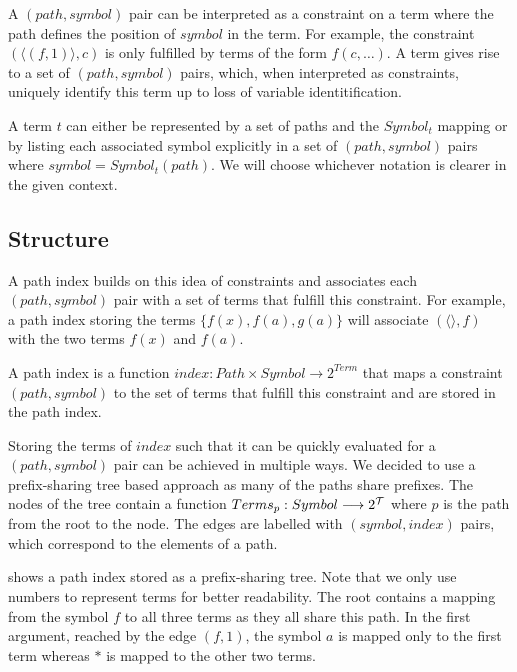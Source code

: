 A $(path, symbol)$ pair can be interpreted as a constraint on a term where the path defines the position of $symbol$ in the term. For example, the constraint $(\langle (f,1) \rangle, c)$ is only fulfilled by terms of the form $f(c,\dots)$. A term gives rise to a set of $(path, symbol)$ pairs, which, when interpreted as constraints, uniquely identify this term up to loss of variable identitification.

A term $t$ can either be represented by a set of paths and the $Symbol_{t}$ mapping or by listing each associated symbol explicitly in a set of $(path, symbol)$ pairs where $symbol = Symbol_{t}(path)$. We will choose whichever notation is clearer in the given context.

\subsection{Structure}
A path index builds on this idea of constraints and associates each $(path, symbol)$ pair with a set of terms that fulfill this constraint. For example, a path index storing the terms $\{f(x), f(a), g(a)\}$ will associate $(\langle \rangle, f)$ with the two terms $f(x)$ and $f(a)$.

\begin{defn}
  A path index is a function $index: Path \times Symbol \longrightarrow 2^{Term}$ that maps a constraint $(path,symbol)$ to the set of terms that fulfill this constraint and are stored in the path index.
\end{defn}

Storing the terms of $index$ such that it can be quickly evaluated for a $(path, symbol)$ pair can be achieved in multiple ways. We decided to use a prefix-sharing tree based approach as many of the paths share prefixes. The nodes of the tree contain a function $Terms_{p}: Symbol  \longrightarrow 2^{\mathcal{T}}$ where $p$ is the path from the root to the node. The edges are labelled with $(symbol, index)$ pairs, which correspond to the elements of a path.

 shows a path index stored as a prefix-sharing tree. Note that we only use numbers to represent terms for better readability. The root contains a mapping from the symbol $f$ to all three terms as they all share this path. In the first argument, reached by the edge $(f,1)$, the symbol $a$ is mapped only to the first term whereas $*$ is mapped to the other two terms.

